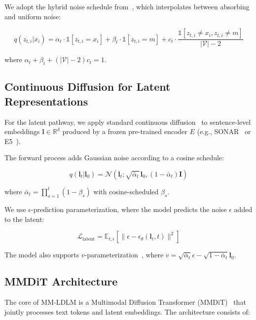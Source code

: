 \documentclass{article}
\begin{document}
We adopt the hybrid noise schedule from~\citet{ruette2024gidd}, which interpolates between absorbing and uniform noise:

\begin{equation}
    q(z_{t,i} | x_i) = \alpha_t \cdot \mathds{1}[z_{t,i} = x_i] + \beta_t \cdot \mathds{1}[z_{t,i} = m] + c_t \cdot \frac{\mathds{1}[z_{t,i} \neq x_i, z_{t,i} \neq m]}{|\mathcal{V}| - 2}
\end{equation}

where $\alpha_t + \beta_t + (|\mathcal{V}| - 2) c_t = 1$.

\subsection{Continuous Diffusion for Latent Representations}

For the latent pathway, we apply standard continuous diffusion~\citep{ho2020ddpm} to sentence-level embeddings $\mathbf{l} \in \mathbb{R}^d$ produced by a frozen pre-trained encoder $E$ (e.g., SONAR~\citep{duquenne2023sonar} or E5~\citep{wang2024e5}).

The forward process adds Gaussian noise according to a cosine schedule:

\begin{equation}
    q(\mathbf{l}_t | \mathbf{l}_0) = \mathcal{N}(\mathbf{l}_t; \sqrt{\bar{\alpha}_t} \, \mathbf{l}_0, (1 - \bar{\alpha}_t) \mathbf{I})
\end{equation}

where $\bar{\alpha}_t = \prod_{s=1}^{t} (1 - \beta_s)$ with cosine-scheduled $\beta_s$.

We use $\epsilon$-prediction parameterization, where the model predicts the noise $\epsilon$ added to the latent:

\begin{equation}
    \mathcal{L}_{\text{latent}} = \mathbb{E}_{t, \epsilon} \left[ \| \epsilon - \epsilon_\theta(\mathbf{l}_t, t) \|^2 \right]
\end{equation}

The model also supports $v$-parameterization~\citep{nichol2021improved}, where $v = \sqrt{\bar{\alpha}_t} \epsilon - \sqrt{1 - \bar{\alpha}_t} \mathbf{l}_0$.

\subsection{MMDiT Architecture}

The core of MM-LDLM is a Multimodal Diffusion Transformer (MMDiT)~\citep{esser2024sd3} that jointly processes text tokens and latent embeddings. The architecture consists of:
\end{document}
